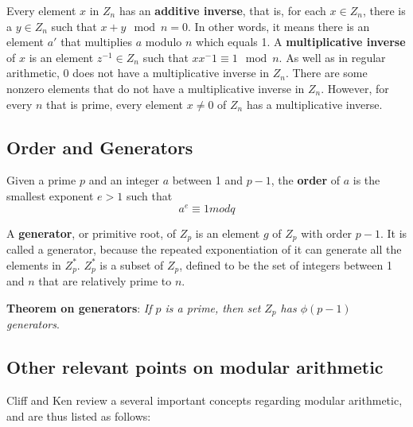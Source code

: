 Every element $x$ in $Z_{n}$ has an \textbf{additive inverse}, that is, for each $x \in Z_{n}$, there is a $y \in Z_{n}$ such that $x + y \mod n = 0$. In other words, it means there is an element $a'$ that multiplies $a$ modulo $n$ which equals 1.  A \textbf{multiplicative inverse} of $x$ is an element $z^{-1} \in Z_{n}$ such that $xx^-1 \equiv 1 \mod n$. As well as in regular arithmetic, 0 does not have a multiplicative inverse in $Z_{n}$. There are some nonzero elements that do not have a multiplicative inverse in $Z_{n}$. However, for every $n$ that is prime, every element $x \ne 0$ of $Z_{n}$ has a multiplicative inverse.

\subsection{Order and Generators}

Given a prime $p$ and an integer $a$ between 1 and $p-1$, the \textbf{order} of $a$ is the smallest exponent $e > 1 $ such that
\begin{equation}
  a^{e} \equiv 1 mod q
\end{equation}

A \textbf{generator}, or primitive root, of $Z_{p}$ is an element $g$ of $Z_{p}$ with order $p-1$. It is called a generator, because the repeated exponentiation of it can generate all the elements in $Z_{p}^{*}$. $Z_{p}^{*}$ is a subset of $Z_{p}$, defined to be the set of integers between 1 and $n$ that are relatively prime to $n$. 

\textbf{Theorem on generators}: \textit{If $p$ is a prime, then set $Z_{p}$ has $\phi(p-1)$ generators}. 

\subsection{Other relevant points on modular arithmetic}

Cliff and Ken \cite{cs21math19notes} review a several important concepts regarding modular arithmetic, and are thus listed as follows:

